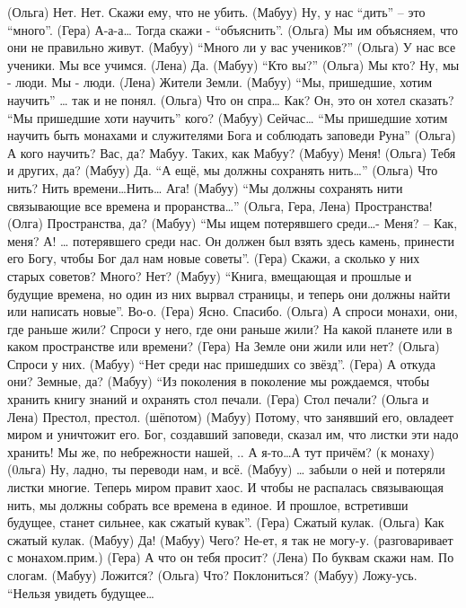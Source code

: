  (Ольга) Нет. Нет. Скажи ему, что не убить. 
 (Мабуу) Ну, у нас ``дить'' – это ``много''. 
 (Гера)  А-а-а… Тогда скажи - ``объяснить''.
 (Ольга) Мы им объясняем, что они не правильно живут.
 (Мабуу) ``Много ли у вас учеников?''
 (Ольга) У нас все ученики. Мы все учимся.
 (Лена)  Да.
 (Мабуу) ``Кто вы?''
 (Ольга)  Мы кто? Ну, мы - люди. Мы - люди. 
 (Лена)   Жители Земли.
 (Мабуу) ``Мы,  пришедшие, хотим научить'' … так и  не понял.
 (Ольга)  Что он спра… Как? Он,  это он хотел сказать? ``Мы пришедшие хоти научить'' кого?  
 (Мабуу)  Сейчас… ``Мы пришедшие хотим научить быть монахами и служителями Бога и соблюдать заповеди Руна''
 (Ольга)  А кого научить? Вас, да?  Мабуу.  Таких, как Мабуу?
 (Мабуу)  Меня!
 (Ольга)  Тебя и других, да?
 (Мабуу)  Да. ``А ещё, мы должны сохранять нить…''
 (Ольга)  Что нить? Нить времени…Нить… Ага!
 (Мабуу) ``Мы должны сохранять нити связывающие все времена и проранства…''
 (Ольга, Гера, Лена) Пространства! 
 (Олга)  Пространства, да?
 (Мабуу)  ``Мы ищем потерявшего среди…-  Меня? – Как, меня? А!  … потерявшего среди  нас. Он должен был взять здесь камень, принести его Богу, чтобы Бог дал нам новые советы''.
 (Гера)   Скажи, а сколько у них старых советов? Много? Нет?
 (Мабуу) ``Книга, вмещающая и прошлые и будущие времена, но один из них вырвал страницы, и теперь они должны найти или написать новые''. Во-о.
 (Гера)   Ясно. Спасибо.
 (Ольга)  А спроси монахи, они, где раньше жили? Спроси у него, где они раньше жили? На какой планете или в каком пространстве или времени? 
 (Гера)   На Земле они жили или нет?
 (Ольга)  Спроси у них.
 (Мабуу) ``Нет среди нас пришедших со звёзд''.
 (Гера)   А откуда они? Земные, да? 
 (Мабуу) ``Из поколения в поколение мы рождаемся, чтобы хранить книгу знаний и охранять  стол печали.
 (Гера)  Стол печали?
 (Ольга и Лена)  Престол,  престол. (шёпотом)
  (Мабуу)  Потому, что занявший его, овладеет миром и уничтожит его. Бог, создавший заповеди, сказал им, что листки эти надо хранить! Мы же, по небрежности нашей, .. А я-то…А тут причём? (к монаху)
 (0льга) Ну, ладно, ты переводи нам, и всё.
 (Мабуу) … забыли о ней и потеряли листки многие. Теперь миром правит хаос. И чтобы не распалась связывающая нить, мы должны собрать все времена в единое. И прошлое, встретивши будущее, станет сильнее,  как сжатый кувак''.
 (Гера)    Сжатый кулак.
 (Ольга)   Как сжатый кулак.
 (Мабуу) Да!
 (Мабуу)  Чего? Не-ет, я так не могу-у. (разговаривает с монахом.прим.)
 (Гера)   А что он тебя просит?
 (Лена)   По буквам скажи нам. По слогам.
 (Мабуу)  Ложится? 
 (Ольга)  Что? Поклониться?
 (Мабуу)  Ложу-усь. ``Нельзя увидеть будущее…
